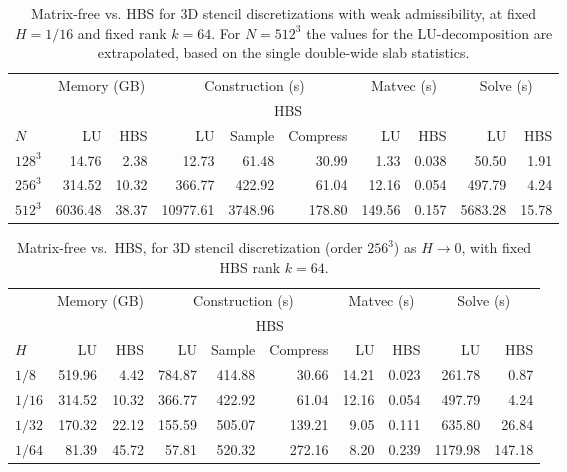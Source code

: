 \documentclass[final,onefignum,onetabnum]{siamart250211}
\theoremstyle{definition}
\begin{document}
\begin{table}[htbp]
\centering

\begin{tabular}{@{}lrrrrrrrrr@{}}
	\toprule
	& \multicolumn{2}{c}{Memory (GB)} & \multicolumn{3}{c}{Construction (s)} & \multicolumn{2}{c}{Matvec (s)} & \multicolumn{2}{c}{Solve (s)} \\
	\cmidrule(lr){2-3}\cmidrule(lr){4-6}\cmidrule(lr){7-8}\cmidrule(lr){9-10}
	& & & & \multicolumn{2}{c}{HBS} & & & & \\
	\cmidrule(lr){5-6}
	$N$ & LU & HBS & LU & Sample & Compress & LU & HBS & LU & HBS \\
	\midrule
	$128^3$ & 14.76   & 2.38  & 12.73    & 61.48   & 30.99  & 1.33   & 0.038 & 50.50   & 1.91  \\
	$256^3$ & 314.52  & 10.32 & 366.77   & 422.92  & 61.04  & 12.16  & 0.054 & 497.79  & 4.24  \\
	$512^3$ & 6036.48 & 38.37 & 10977.61 & 3748.96 & 178.80 & 149.56 & 0.157 & 5683.28 & 15.78 \\
	\bottomrule
\end{tabular}
\caption{Matrix-free vs. HBS for 3D stencil discretizations with weak admissibility, at fixed $H=1/16$ and fixed rank $k=64$. For $N = 512^3$ the values for the LU-decomposition are extrapolated, based on the single double-wide slab statistics.}
\label{tab:lu_vs_hbs}
\end{table}


\begin{table}[htbp]\centering
\begin{tabular}{@{}lrrrrrrrrr@{}}
\toprule
& \multicolumn{2}{c}{Memory (GB)} & \multicolumn{3}{c}{Construction (s)} & \multicolumn{2}{c}{Matvec (s)} & \multicolumn{2}{c}{Solve (s)} \\
\cmidrule(lr){2-3}\cmidrule(lr){4-6}\cmidrule(lr){7-8}\cmidrule(lr){9-10}
& & & & \multicolumn{2}{c}{HBS} & & & & \\ \cmidrule(lr){5-6}
{$H$} & {LU} & {HBS} & {LU} & {Sample} & {Compress} & {LU} & {HBS} & {LU} & {HBS} \\
\midrule
{$1/8$}  & 519.96 & 4.42  & 784.87 & 414.88 & 30.66  & 14.21 & 0.023 & 261.78 & 0.87 \\
{$1/16$} & 314.52   & 10.32 & 366.77  & 422.92  & 61.04  & 12.16  & 0.054 & 497.79  & 4.24 \\
{$1/32$} & 170.32  & 22.12 & 155.59 & 505.07 & 139.21 & 9.05  & 0.111 & 635.80 & 26.84 \\
{$1/64$} & 81.39  & 45.72 & 57.81 & 520.32 & 272.16 & 8.20  & 0.239 & 1179.98 & 147.18 \\
\bottomrule
\end{tabular}
\caption{Matrix-free vs.\ HBS, for 3D stencil discretization (order $256^3$) as $H\rightarrow 0$, with fixed HBS rank $k=64$.}
\label{tab:lu_vs_hbs_Htozero}
\end{table}
\end{document}
